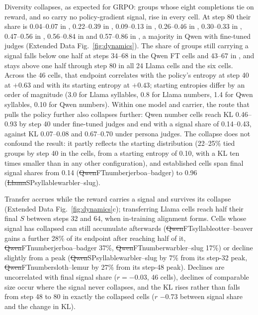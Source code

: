 Diversity collapses, as expected for GRPO: groups whose eight completions tie on reward, and so carry no policy-gradient signal, rise in every cell. At step 80 their share is 0.04--0.07 in , 0.22--0.39 in , 0.09--0.13 in , 0.26--0.46 in , 0.30--0.33 in , 0.47--0.56 in , 0.56--0.84 in  and 0.57--0.86 in , a majority in Qwen with fine-tuned judges (Extended Data Fig.~\ref{fig:dynamics}). The share of groups still carrying a signal falls below one half at steps 34--68 in the Qwen FT cells and 43--67 in , and stays above one half through step 80 in all 24 Llama cells and the six  cells. Across the 46 cells, that endpoint correlates with the policy's entropy at step 40 at $+0.63$ and with its starting entropy at $+0.43$; starting entropies differ by an order of magnitude (3.0 for Llama syllables, 0.8 for Llama numbers, 1.4 for Qwen syllables, 0.10 for Qwen numbers). Within one model and carrier, the route that pulls the policy further also collapses further: Qwen number cells reach KL 0.46--0.93 by step 40 under fine-tuned judges and end with a signal share of 0.14--0.43, against KL 0.07--0.08 and 0.67--0.70 under persona judges. The collapse does not confound the result: it partly reflects the starting distribution (22--25\% tied groups by step 40 in the  cells, from a starting entropy of 0.10, with a KL ten times smaller than in any other configuration), and established cells span final signal shares from 0.14 (\st{Qwen}{FT}{number}{jerboa--badger}) to 0.96 (\st{Llama}{SP}{syllable}{warbler--slug}).

Transfer accrues while the reward carries a signal and survives its collapse (Extended Data Fig.~\ref{fig:dynamics}c); transferring Llama cells reach half their final $S$ between steps 32 and 64, when in-training alignment forms. Cells whose signal has collapsed can still accumulate afterwards (\st{Qwen}{FT}{syllable}{otter--beaver} gains a further 28\% of its endpoint after reaching half of it, \st{Qwen}{FT}{number}{jerboa--badger} 37\%, \st{Qwen}{FT}{number}{warbler--slug} 17\%) or decline slightly from a peak (\st{Qwen}{SP}{syllable}{warbler--slug} by 7\% from its step-32 peak, \st{Qwen}{FT}{number}{sloth--lemur} by 27\% from its step-48 peak). Declines are uncorrelated with final signal share ($r = -0.03$, 46 cells), declines of comparable size occur where the signal never collapses, and the KL rises rather than falls from step 48 to 80 in exactly the collapsed cells ($r$ $-0.73$ between signal share and the change in KL).

